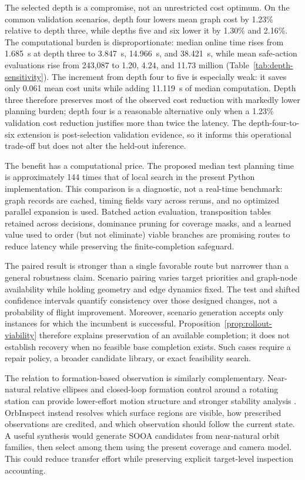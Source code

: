 \documentclass{IEEEtaes}
\newcommand{\unit}[2]{#1~#2}
\theoremstyle{remark}
\theoremstyle{plain}
\begin{document}
The selected depth is a compromise, not an unrestricted cost optimum. On the common validation scenarios, depth four lowers mean graph cost by 1.23\% relative to depth three, while depths five and six lower it by 1.30\% and 2.16\%. The computational burden is disproportionate: median online time rises from \unit{1.685}{s} at depth three to \unit{3.847}{s}, \unit{14.966}{s}, and \unit{38.421}{s}, while mean safe-action evaluations rise from 243,087 to 1.20, 4.24, and 11.73 million (Table~\ref{tab:depth-sensitivity}). The increment from depth four to five is especially weak: it saves only 0.061 mean cost units while adding \unit{11.119}{s} of median computation. Depth three therefore preserves most of the observed cost reduction with markedly lower planning burden; depth four is a reasonable alternative only when a 1.23\% validation cost reduction justifies more than twice the latency. The depth-four-to-six extension is post-selection validation evidence, so it informs this operational trade-off but does not alter the held-out inference.

The benefit has a computational price. The proposed median test planning time is approximately 144 times that of local search in the present Python implementation. This comparison is a diagnostic, not a real-time benchmark: graph records are cached, timing fields vary across reruns, and no optimized parallel expansion is used. Batched action evaluation, transposition tables retained across decisions, dominance pruning for coverage masks, and a learned value used to order (but not eliminate) viable branches are promising routes to reduce latency while preserving the finite-completion safeguard.

The paired result is stronger than a single favorable route but narrower than a general robustness claim. Scenario pairing varies target priorities and graph-node availability while holding geometry and edge dynamics fixed. The test and shifted confidence intervals quantify consistency over those designed changes, not a probability of flight improvement. Moreover, scenario generation accepts only instances for which the incumbent is successful. Proposition~\ref{prop:rollout-viability} therefore explains preservation of an available completion; it does not establish recovery when no feasible base completion exists. Such cases require a repair policy, a broader candidate library, or exact feasibility search.

The relation to formation-based observation is similarly complementary. Near-natural relative ellipses and closed-loop formation control around a rotating station can provide lower-effort motion structure and stronger stability analysis \cite{zhou2026formation}. OrbInspect instead resolves which surface regions are visible, how prescribed observations are credited, and which observation should follow the current state. A useful synthesis would generate SOOA candidates from near-natural orbit families, then select among them using the present coverage and camera model. This could reduce transfer effort while preserving explicit target-level inspection accounting.
\end{document}
